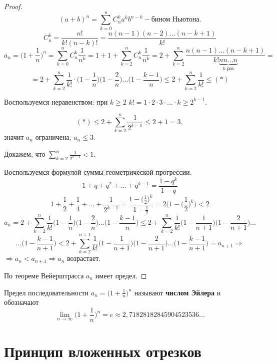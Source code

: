 	\begin{proof}
		\[ (a + b)^n = \sum_{k = 0}^n C_n^k a^k b^{n - k} - \text{бином Ньютона.} \]
		\[ C_n^k = \frac{n!}{k!(n - k)!} = \frac{n(n - 1)(n - 2)...(n - k + 1)}{k!} \]
		\[ a_n = \bigg(1 + \frac{1}{n}\bigg)^n = \sum_{k = 0}^n C_n^k \frac{1}{n^k} = 1 + 1 + \sum_{k = 2}^n C_n^k \frac{1}{n^k} = 2 + \sum_{k = 2}^n \frac{n(n - 1)...(n - k + 1)}{k! \underbrace{n n ... n}_{k \text{ раз}}} = \]
		\[ = 2 + \sum_{k = 2}^n \frac{1}{k!} \cdot \bigg(1 - \frac{1}{n}\bigg)\bigg(1 - \frac{2}{n}\bigg)...\bigg(1 - \frac{k - 1}{n}\bigg) \leqslant 2 + \sum_{k = 2}^n \frac{1}{k!} \leqslant (*) \]
		
		Воспользуемся неравенством: при $k \geqslant 2$ $k! = 1 \cdot 2 \cdot 3 \cdot ... \cdot k \geqslant 2^{k - 1}.$
		
		\[ (*) \leqslant 2 + \sum_{k = 2}^n \frac{1}{2^{k - 1}} \leqslant 2 + 1 = 3, \]
		значит $a_n$ ограничена, $a_n \leqslant 3.$
		
		Докажем, что $\sum_{k = 2}^n \frac{1}{2^{k - 1}} < 1$.
		
		Воспользуемся формулой суммы геометрической прогрессии.
		\[ 1 + q + q^2 + ... + q^{k - 1} = \frac{1 - q^k}{1 - q} \]
		\[ 1 + \frac{1}{2} + \frac{1}{4} + ... + \frac{1}{2^{k - 1}} = \frac{1 - \big(\frac{1}{2}\big)^k}{1 - \frac{1}{2}} = 2 \bigg(1 - \bigg(\frac{1}{2}\bigg)^k\bigg) < 2 \]
		\[ a_n = 2 + \sum_{k = 2}^n \frac{1}{k!} \bigg(1 - \frac{1}{n}\bigg)\bigg(1 - \frac{2}{n}\bigg)...\bigg(1 - \frac{k - 1}{n}\bigg) \leqslant 2 + \sum_{k = 2}^n \frac{1}{k!} \bigg(1 - \frac{1}{n + 1}\bigg)\bigg(1 - \frac{2}{n + 1}\bigg)... \]
		\[ ...\bigg(1 - \frac{k - 1}{n + 1}\bigg) < 2 + \sum_{k = 2}^{n + 1} \frac{1}{k!} \bigg(1 - \frac{1}{n + 1}\bigg)\bigg(1 - \frac{2}{n + 1}\bigg)...\bigg(1 - \frac{k - 1}{n + 1}\bigg) = a_{n + 1} \Rightarrow \]
		$\Rightarrow a_n < a_{n + 1} \Rightarrow a_n \text{ возрастает}.$
		
		По теореме Вейерштрасса $a_n$ имеет предел.
	\end{proof}
	
	\begin{definition}
		Предел последовательности $a_n = \big(1 + \frac{1}{n}\big)^n$ называют \textbf{числом Эйлера} и обозначают
		\[ \lim_{n \to \infty} \bigg(1 + \frac{1}{n}\bigg)^n = e \approx 2,71828182845904523536... \]
	\end{definition}
	
	\section{Принцип вложенных отрезков}
	
